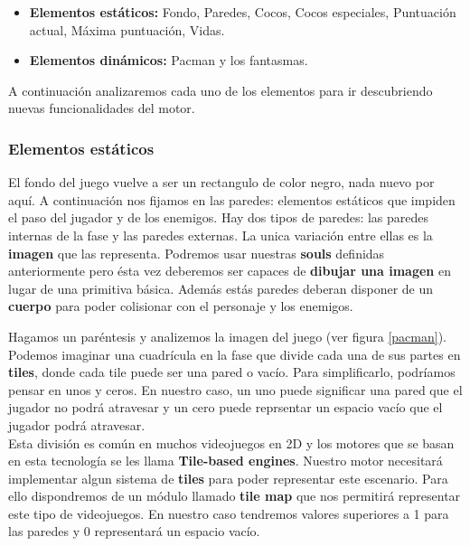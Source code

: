 \documentclass[a4paper]{article}
\begin{document}
\begin{itemize}
  \item \textbf{Elementos estáticos:} Fondo, Paredes, Cocos, Cocos especiales, Puntuación actual, Máxima puntuación, Vidas.
  \item \textbf{Elementos dinámicos:} Pacman y los fantasmas.
\end{itemize}

A continuación analizaremos cada uno de los elementos para ir descubriendo nuevas funcionalidades del motor.

\subsubsection{Elementos estáticos}

El fondo del juego vuelve a ser un rectangulo de color negro, nada nuevo por aquí. A continuación nos fijamos en las paredes: elementos estáticos que impiden el paso del jugador y de los enemigos. Hay dos tipos de paredes: las paredes internas de la fase y las paredes externas. La unica variación entre ellas es la \textbf{imagen} que las representa. Podremos usar nuestras \textbf{souls} definidas anteriormente pero ésta vez deberemos ser capaces de \textbf{dibujar una imagen} en lugar de una primitiva básica. Además estás paredes deberan disponer de un \textbf{cuerpo} para poder colisionar con el personaje y los enemigos.

Hagamos un paréntesis y analizemos la imagen del juego (ver figura \ref{pacman}). Podemos imaginar una cuadrícula en la fase que divide cada una de sus partes en \textbf{tiles}, donde cada tile puede ser una pared o vacío. Para simplificarlo, podríamos pensar en unos y ceros. En nuestro caso, un uno puede significar una pared que el jugador no podrá atravesar y un cero puede reprsentar un espacio vacío que el jugador podrá atravesar. \\
Esta división es común en muchos videojuegos en 2D y los motores que se basan en esta tecnología se les llama \textbf{Tile-based engines}. Nuestro motor necesitará implementar algun sistema de \textbf{tiles} para poder representar este escenario. Para ello dispondremos de un módulo llamado \textbf{tile map} que nos permitirá representar este tipo de videojuegos. En nuestro caso tendremos valores superiores a 1 para las paredes y 0 representará un espacio vacío.
\end{document}
